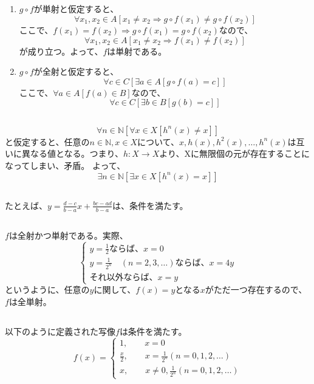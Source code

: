\documentclass{jsarticle}
\begin{document}
\subsection{}
\begin{enumerate}
\item
$g\circ f$が単射と仮定すると、
\[\forall x_1, x_2\in A[x_1\neq x_2 \Longrightarrow g\circ f(x_1)\neq g\circ f(x_2) ]\]
ここで、$f(x_1)=f(x_2)\Longrightarrow g\circ f(x_1)=g\circ f(x_2)$なので、
\[\forall x_1, x_2\in A[x_1\neq x_2 \Longrightarrow f(x_1)\neq f(x_2) ]\]
が成り立つ。よって、$f$は単射である。
\item
$g\circ f$が全射と仮定すると、
\[\forall c\in C[\exists a\in A[g\circ f(a)=c]]\]
ここで、$\forall a\in A[f(a)\in B]$なので、
\[\forall c\in C[\exists b\in B[g(b)=c]]\]
\end{enumerate}

\subsection{}
\[\forall n\in \mathbb{N}[\forall x\in X[h^n(x)\neq x]]\]
と仮定すると、任意の$n\in\mathbb{N}, x\in X$について、$x,h(x),h^2(x),\dots,h^n(x)$は互いに異なる値となる。つまり、$h:X\to X$より、Xに無限個の元が存在することになってしまい、矛盾。
よって、
\[\exists n\in \mathbb{N}[\exists x\in X[h^n(x)= x]]\]

\subsection{}
たとえば、$y=\frac{d-c}{b-a}x+\frac{bc-ad}{b-a}$は、条件を満たす。

\subsection{}
$f$は全射かつ単射である。実際、
\[
\begin{cases}
y=\frac{1}{2}ならば、x=0\\
y=\frac{1}{2^n}\quad(n=2,3,\dots)ならば、x=4y\\
それ以外ならば、x=y
\end{cases}
\]
というように、任意の$y$に関して、$f(x)=y$となる$x$がただ一つ存在するので、$f$は全単射。

\subsection{}
以下のように定義された写像$f$は条件を満たす。
\[f(x)=
\begin{cases}
1,  \qquad x=0\\
\frac{x}{2}, \qquad x=\frac{1}{2^n}(n=0,1,2,\dots)\\
x, \qquad x\neq 0, \frac{1}{2^n}(n=0,1,2,\dots)
\end{cases}
\]
\end{document}

